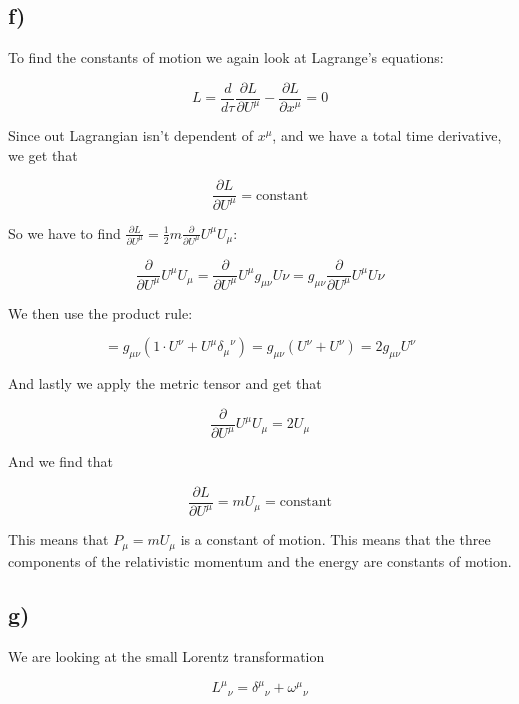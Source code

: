 \documentclass[a4paper,norsk, 10pt]{article}
\begin{document}
\subsection*{f)}

To find the constants of motion we again look at Lagrange's equations:

$$
L = \frac{d}{d\tau}\frac{\partial L}{\partial U^{\mu}} - \frac{\partial L}{\partial x^{\mu}} = 0
$$

Since out Lagrangian isn't dependent of $x^{\mu}$, and we have a total time derivative, we get that

\begin{equation}
\frac{\partial L}{\partial U^{\mu}}  = \text{constant}
\end{equation}

So we have to find $\frac{\partial L}{\partial U^{\mu}} = \frac{1}{2}m\frac{\partial }{\partial U^{\mu}} U^{\mu}U_{\mu} $:

$$
\frac{\partial }{\partial U^{\mu}} U^{\mu}U_{\mu} = \frac{\partial }{\partial U^{\mu}}  U^{\mu}g_{\mu \nu}U{\nu} = g_{\mu \nu}\frac{\partial }{\partial U^{\mu}}  U^{\mu}U{\nu}
$$

We then use the product rule:

$$
= g_{\mu \nu} \left(1\cdot U^{\nu} + U^{\mu}{\delta_{\mu}}^{\nu}\right) = g_{\mu \nu}\left(U^{\nu} + U^{\nu}\right) = 2g_{\mu \nu}U^{\nu}
$$

And lastly we apply the metric tensor and get that

$$
\frac{\partial }{\partial U^{\mu}} U^{\mu}U_{\mu} = 2U_{\mu}
$$

And we find that 

\begin{equation}
\frac{\partial L}{\partial U^{\mu}} = mU_{\mu} = \text{constant}
\end{equation}

This means that $P_{\mu} = mU_{\mu}$ is a constant of motion. This means that the three components of the relativistic momentum and the energy are constants of motion.

\subsection*{g)}
We are looking at the small Lorentz transformation

\begin{equation}
{L^{\mu}}_{\nu} = {\delta^{\mu}}_{\nu} + {\omega^{\mu}}_{\nu} 
\end{equation}
\end{document}
